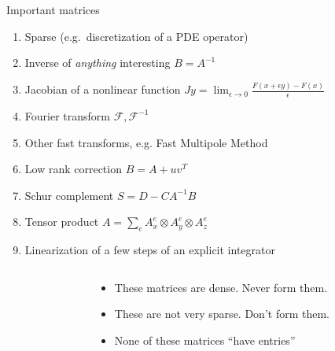 \begin{frame}{Important matrices}
  \begin{enumerate}
  \item Sparse (e.g.~discretization of a PDE operator)
  \item \alert<2,4>{Inverse of \emph{anything} interesting $B = A^{-1}$}
  \item \alert<4>{Jacobian of a nonlinear function $J y = \lim_{\epsilon \to 0} \frac{F(x + \epsilon y) - F(x)}{\epsilon}$}
  \item \alert<2,4>{Fourier transform $\mathcal{F},\mathcal{F}^{-1}$}
  \item \alert<2,4>{Other fast transforms, e.g. Fast Multipole Method}
  \item \alert<2,4>{Low rank correction $B = A + u v^T$}
  \item \alert<2,4>{Schur complement $S = D - C A^{-1} B$}
  \item \alert<3,4>{Tensor product $A = \sum_e A_x^e \otimes A_y^e \otimes A_z^e$}
  \item \alert<3,4>{Linearization of a few steps of an explicit integrator}
  \end{enumerate}
  \begin{columns}\begin{column}{0.3\textwidth}\end{column}\begin{column}{0.7\textwidth}
  \begin{itemize}
  \item<only@2> These matrices are \alert<2>{dense}.  Never form them.
  \item<only@3>{These are \alert<3>{not very sparse}.}
    Don't form them.
  \item<only@4> {None of these matrices ``have entries''}
  \end{itemize}
\end{column}
\end{columns}
\end{frame}
